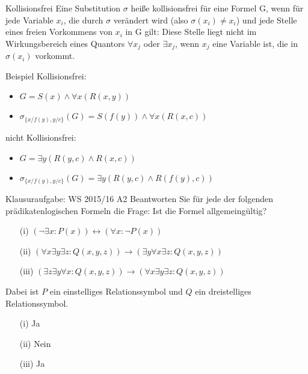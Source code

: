 \begin{frame}{Kollisionsfrei}
 Eine Substitution $\sigma$ heiße kollisionsfrei für eine Formel G, wenn für jede Variable $x_i$, die durch $\sigma$ verändert wird (also $\sigma(x_i) \neq x_i$) und jede Stelle eines freien Vorkommens von $x_i$ in G gilt: Diese Stelle liegt nicht im Wirkungsbereich eines Quantors $\forall x_j$ oder $\exists x_j$, wenn $x_j$ eine Variable ist, die in $\sigma(x_i)$ vorkommt.
\end{frame}

\begin{frame}{Beispiel}
  Kollisionsfrei:
  \begin{itemize}
    \item $G=S(x)\land \forall x(R(x,y))$
    \item $\sigma_{\{x/f(y),y/c\}}(G)=S(f(y))\land \forall x(R(x,c))$
  \end{itemize}
  nicht Kollisionsfrei:
  \begin{itemize}
    \item $G=\exists y(R(y,c)\land R(x,c))$
    \item $\sigma_{\{x/f(y),y/c\}}(G)=\exists y(R(y,c)\land R(f(y),c))$
  \end{itemize}
\end{frame}

\begin{frame}{Klausuraufgabe: WS 2015/16 A2}
  Beantworten Sie für jede der folgenden prädikatenlogischen Formeln die Frage: \glqq Ist die Formel allgemeingültig?\grqq
  \begin{itemize}
    \item[(i)] $(\lnot\exists x: P(x)) \leftrightarrow (\forall x:\lnot P(x))$
    \item[(ii)] $(\forall x\exists y\exists z: Q(x,y,z))\rightarrow(\exists y\forall x\exists z:Q(x,y,z))$
    \item[(iii)] $(\exists z\exists y\forall x: Q(x,y,z))\rightarrow (\forall x\exists y\exists z:Q(x,y,z))$
  \end{itemize}
  Dabei ist $P$ ein einstelliges Relationssymbol und $Q$ ein dreistelliges Relationssymbol.
  \pause
  \begin{itemize}
    \item[(i)] Ja
    \pause
    \item[(ii)] Nein
    \pause
    \item[(iii)] Ja
  \end{itemize}
\end{frame}


